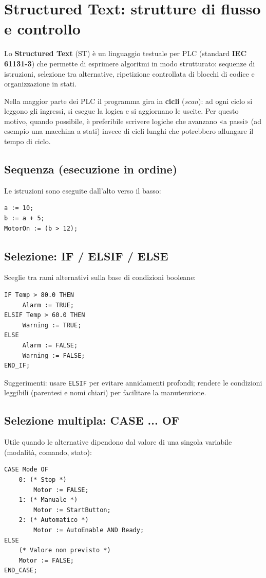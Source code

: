 \chapter{Structured Text: strutture di flusso e controllo}
\label{cap:strutture-st}

Lo \textbf{Structured Text} (ST) è un linguaggio testuale per PLC (standard \textbf{IEC 61131-3}) che permette di esprimere algoritmi in modo strutturato: sequenze di istruzioni, selezione tra alternative, ripetizione controllata di blocchi di codice e organizzazione in stati.

\begin{note}
Nella maggior parte dei PLC il programma gira in \textbf{cicli} (\emph{scan}): ad ogni ciclo si leggono gli ingressi, si esegue la logica e si aggiornano le uscite. Per questo motivo, quando possibile, è preferibile scrivere logiche che avanzano «a passi» (ad esempio una macchina a stati) invece di cicli lunghi che potrebbero allungare il tempo di ciclo.
\end{note}

\section{Sequenza (esecuzione in ordine)}
Le istruzioni sono eseguite dall'alto verso il basso:
\begin{lstlisting}[basicstyle=\ttfamily\small]
a := 10;
b := a + 5;
MotorOn := (b > 12);
\end{lstlisting}

\section{Selezione: IF / ELSIF / ELSE}
Sceglie tra rami alternativi sulla base di condizioni booleane:
\begin{lstlisting}[basicstyle=\ttfamily\small]
IF Temp > 80.0 THEN
     Alarm := TRUE;
ELSIF Temp > 60.0 THEN
     Warning := TRUE;
ELSE
     Alarm := FALSE;
     Warning := FALSE;
END_IF;
\end{lstlisting}
Suggerimenti: usare \texttt{ELSIF} per evitare annidamenti profondi; rendere le condizioni leggibili (parentesi e nomi chiari) per facilitare la manutenzione.

\section{Selezione multipla: CASE ... OF}
Utile quando le alternative dipendono dal valore di una singola variabile (modalità, comando, stato):
\begin{lstlisting}[basicstyle=\ttfamily\small]
CASE Mode OF
    0: (* Stop *)
        Motor := FALSE;
    1: (* Manuale *)
        Motor := StartButton;
    2: (* Automatico *)
        Motor := AutoEnable AND Ready;
ELSE
    (* Valore non previsto *)
    Motor := FALSE;
END_CASE;
\end{lstlisting}

